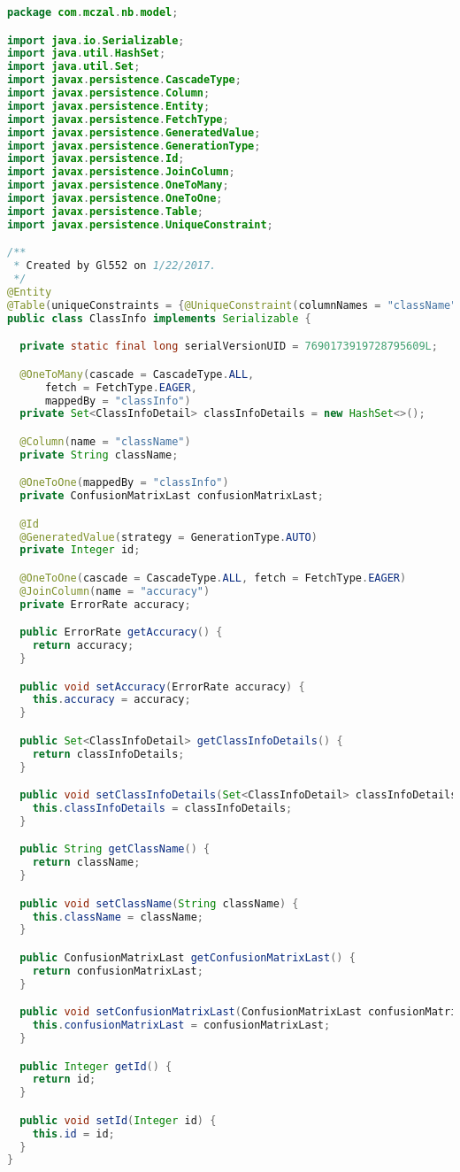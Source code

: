 \begin{lstlisting}[language=Java,basicstyle=\tiny,caption=ClassInfo.java]
package com.mczal.nb.model;

import java.io.Serializable;
import java.util.HashSet;
import java.util.Set;
import javax.persistence.CascadeType;
import javax.persistence.Column;
import javax.persistence.Entity;
import javax.persistence.FetchType;
import javax.persistence.GeneratedValue;
import javax.persistence.GenerationType;
import javax.persistence.Id;
import javax.persistence.JoinColumn;
import javax.persistence.OneToMany;
import javax.persistence.OneToOne;
import javax.persistence.Table;
import javax.persistence.UniqueConstraint;

/**
 * Created by Gl552 on 1/22/2017.
 */
@Entity
@Table(uniqueConstraints = {@UniqueConstraint(columnNames = "className")})
public class ClassInfo implements Serializable {

  private static final long serialVersionUID = 7690173919728795609L;

  @OneToMany(cascade = CascadeType.ALL,
      fetch = FetchType.EAGER,
      mappedBy = "classInfo")
  private Set<ClassInfoDetail> classInfoDetails = new HashSet<>();

  @Column(name = "className")
  private String className;

  @OneToOne(mappedBy = "classInfo")
  private ConfusionMatrixLast confusionMatrixLast;

  @Id
  @GeneratedValue(strategy = GenerationType.AUTO)
  private Integer id;

  @OneToOne(cascade = CascadeType.ALL, fetch = FetchType.EAGER)
  @JoinColumn(name = "accuracy")
  private ErrorRate accuracy;

  public ErrorRate getAccuracy() {
    return accuracy;
  }

  public void setAccuracy(ErrorRate accuracy) {
    this.accuracy = accuracy;
  }

  public Set<ClassInfoDetail> getClassInfoDetails() {
    return classInfoDetails;
  }

  public void setClassInfoDetails(Set<ClassInfoDetail> classInfoDetails) {
    this.classInfoDetails = classInfoDetails;
  }

  public String getClassName() {
    return className;
  }

  public void setClassName(String className) {
    this.className = className;
  }

  public ConfusionMatrixLast getConfusionMatrixLast() {
    return confusionMatrixLast;
  }

  public void setConfusionMatrixLast(ConfusionMatrixLast confusionMatrixLast) {
    this.confusionMatrixLast = confusionMatrixLast;
  }

  public Integer getId() {
    return id;
  }

  public void setId(Integer id) {
    this.id = id;
  }
}

\end{lstlisting}


